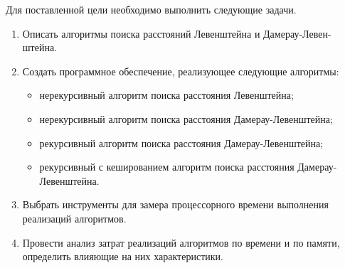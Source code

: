 Для поставленной цели необходимо выполнить следующие задачи.
\begin{enumerate}[label={\arabic*)}]
	\item Описать алгоритмы поиска расстояний Левенштейна и Дамерау-Левен- штейна.
	\item Создать программное обеспечение, реализующее следующие алгоритмы:
	\begin{itemize}[label=---]
		\item нерекурсивный алгоритм поиска расстояния Левенштейна;
		\item нерекурсивный алгоритм поиска расстояния Дамерау-Левенштейна;
		\item рекурсивный алгоритм поиска расстояния Дамерау-Левенштейна;
		\item рекурсивный с кешированием алгоритм поиска расстояния Дамерау-Левенштейна.
	\end{itemize}
	\item Выбрать инструменты для замера процессорного времени выполнения реализаций алгоритмов.
	\item Провести анализ затрат реализаций алгоритмов по времени и по памяти, определить влияющие на них характеристики.
\end{enumerate}